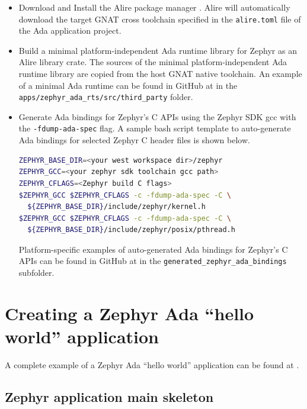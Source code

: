\documentclass{AUJarticle}
\begin{document}
\begin{itemize}

\item Download and Install the Alire package manager \cite{Alire}.
Alire will automatically download the target GNAT cross toolchain
specified in the \verb`alire.toml` file of the Ada application project.

\item Build a minimal platform-independent Ada runtime library for Zephyr
as an Alire library crate.
The sources of the minimal platform-independent Ada runtime library are copied
from the host GNAT native toolchain. An example of a minimal Ada runtime can be
found in GitHub at \cite{ZephyrAda} in the \verb`apps/zephyr_ada_rts/src/third_party`
folder.

\item  Generate Ada bindings for Zephyr's C APIs using the Zephyr SDK gcc
with the \verb`-fdump-ada-spec` flag. A sample bash script template to auto-generate
Ada bindings for selected Zephyr C header files is shown below.
\begin{lstlisting}[language=bash, basicstyle=\ttfamily\scriptsize]
ZEPHYR_BASE_DIR=<your west workspace dir>/zephyr
ZEPHYR_GCC=<your zephyr sdk toolchain gcc path>
ZEPHYR_CFLAGS=<Zephyr build C flags>
$ZEPHYR_GCC $ZEPHYR_CFLAGS -c -fdump-ada-spec -C \
  ${ZEPHYR_BASE_DIR}/include/zephyr/kernel.h
$ZEPHYR_GCC $ZEPHYR_CFLAGS -c -fdump-ada-spec -C \
  ${ZEPHYR_BASE_DIR}/include/zephyr/posix/pthread.h
\end{lstlisting}

Platform-specific examples of auto-generated Ada bindings for Zephyr's C APIs
can be found in GitHub at \cite{ZephyrAda} in the
\verb`generated_zephyr_ada_bindings` subfolder.
\end{itemize}

\section {Creating a Zephyr Ada ``hello world'' application}

A complete example of a Zephyr Ada ``hello world'' application can be found
at \cite{ZephyrAda}.

\subsection {Zephyr application main skeleton}
\end{document}
